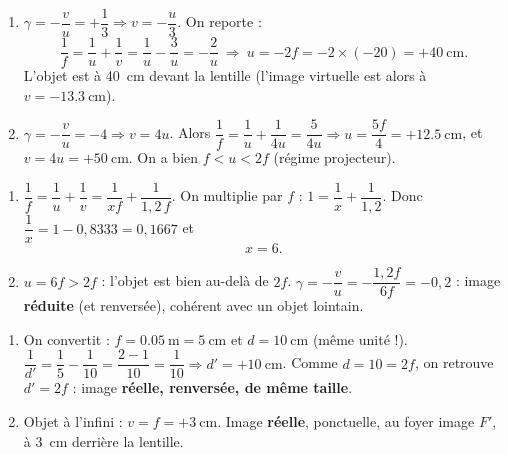 \documentclass[11pt,a4paper]{article}
\begin{document}

\begin{corrige}
\begin{enumerate}[label=\alph*)]
  \item $\gamma=-\dfrac{v}{u}=+\dfrac13\Rightarrow v=-\dfrac{u}{3}$. On reporte :
        \[ \frac{1}{f}=\frac{1}{u}+\frac{1}{v}=\frac{1}{u}-\frac{3}{u}=-\frac{2}{u}
           \ \Rightarrow\ u=-2f=-2\times(-20)=+\qty{40}{\cm}. \]
        L'objet est à \qty{40}{\cm} devant la lentille (l'image virtuelle est alors à
        $v=-\qty{13.3}{\cm}$).
  \item $\gamma=-\dfrac{v}{u}=-4\Rightarrow v=4u$. Alors
        $\dfrac{1}{f}=\dfrac{1}{u}+\dfrac{1}{4u}=\dfrac{5}{4u}\Rightarrow u=\dfrac{5f}{4}=+\qty{12.5}{\cm}$,
        et $v=4u=+\qty{50}{\cm}$. On a bien $f<u<2f$ (régime projecteur).
\end{enumerate}
\end{corrige}

\begin{corrige}
\begin{enumerate}[label=\alph*)]
  \item $\dfrac{1}{f}=\dfrac{1}{u}+\dfrac{1}{v}=\dfrac{1}{xf}+\dfrac{1}{1{,}2\,f}$. On multiplie par
        $f$ : $1=\dfrac{1}{x}+\dfrac{1}{1{,}2}$. Donc $\dfrac{1}{x}=1-0{,}8333=0{,}1667$ et
        \[ x=6. \]
  \item $u=6f>2f$ : l'objet est bien au-delà de $2f$. $\gamma=-\dfrac{v}{u}=-\dfrac{1{,}2f}{6f}=-0{,}2$ :
        image \textbf{réduite} (et renversée), cohérent avec un objet lointain.
\end{enumerate}
\end{corrige}

\begin{corrige}
\begin{enumerate}[label=\alph*)]
  \item On convertit : $f=\qty{0.05}{\m}=\qty{5}{\cm}$ et $d=\qty{10}{\cm}$ (même unité !).
        $\dfrac{1}{d'}=\dfrac{1}{5}-\dfrac{1}{10}=\dfrac{2-1}{10}=\dfrac{1}{10}\Rightarrow d'=+\qty{10}{\cm}$.
        Comme $d=10=2f$, on retrouve $d'=2f$ : image \textbf{réelle, renversée, de même taille}.
  \item Objet à l'infini : $v=f=+\qty{3}{\cm}$. Image \textbf{réelle}, ponctuelle, au foyer image $F'$,
        à \qty{3}{\cm} derrière la lentille.
\end{enumerate}
\end{corrige}
\end{document}
